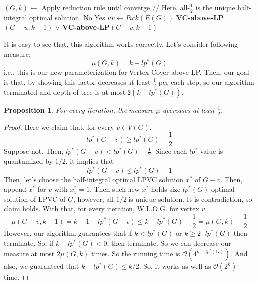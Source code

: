 \documentclass[12pt, a4paper, openany, twoside]{book}
\newtheorem{prop}[thm]{Proposition}
\theoremstyle{definition}
\theoremstyle{remark}
\newcommand{\CO}{{\mathcal {O}}} \newcommand{\CP}{{\mathcal {P}}}
\theoremstyle{plain}
\numberwithin{equation}{section}
\begin{document}
\begin{algorithm}
    
\caption{$\CO(4^{k-lp^*(G)})$-time algorithm for Vertex Cover}

\begin{algorithmic}[1]
\State $(G, k) \gets$ Apply reduction rule until converge
\State // Here, all-$\frac{1}{2}$ is the unique half-integral optimal solution. 
    \State \Return No 
    \State \Return Yes 
\Else   
    \State $uv \gets Pick(E(G))$
    \State \Return \textbf{VC-above-LP}$(G-u, k-1)$ $\vee$ \textbf{VC-above-LP}$(G-v, k-1)$
\EndIf
\EndProcedure
\end{algorithmic}

\end{algorithm}

It is easy to see that, this algorithm works correctly. Let's consider following measure: 
\[\mu(G, k) = k - lp^*(G)\]
i.e., this is our new parameterization for Vertex Cover above LP. Then, our goal is that, 
by showing this factor decreases at least $\frac{1}{2}$ per each step, so our algorithm terminated and 
depth of tree is at most $2(k - lp^*(G))$. 

\begin{prop}
For every iteration, the measure $\mu$ decreases at least $\frac{1}{2}$. 
\end{prop}

\begin{proof}
    
Here we claim that, for every $v \in V(G)$, 
\[lp^*(G - v) \geq lp^*(G) - \frac{1}{2}\]
Suppose not. Then, $lp^*(G - v) < lp^*(G) - \frac{1}{2}$. Since each $lp^*$ value is quantumized by $1/2$, it implies that 
\[lp^*(G-v) \leq lp^*(G) - 1\]
Then, let's choose the half-integral optimal LPVC solution $x^*$ of $G - v$. 
Then, append $x^*$ for $v$ with $x^*_v = 1$. Then such new $x^*$ holds size $lp^*(G)$ optimal solution of LPVC of $G$, however, 
all-$1/2$ is unique solution. It is contradiction, so claim holds. 
With that, for every iteration, W.L.O.G. for vertex $v$,
\[\mu(G-v, k-1) = k - 1 - lp^*(G-v) \leq k - lp^*(G) - \frac{1}{2} = \mu(G, k) - \frac{1}{2}\]
However, our algorithm guarantees that if $k < lp^*(G)$ or $k \geq 2 \cdot lp^*(G)$ then terminate. 
So, if $k - lp^*(G) < 0$, then terminate. So we can decrease our measure at most $2\mu(G, k)$ times. 
So the running time is $\CO(4^{k - lp^*(G)})$. And also, we guaranteed that $k - lp^*(G) \leq k/2$. So, it works as well as $\CO(2^k)$ time. 

\end{proof}
\end{document}
